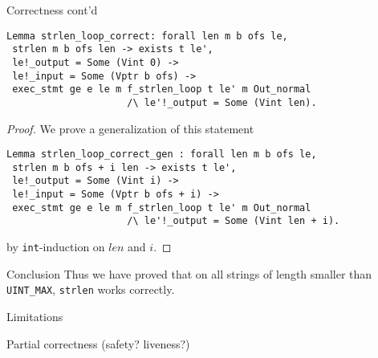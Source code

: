 \documentclass{beamer}
\begin{document}
  
\begin{frame}[fragile]{Correctness cont'd}

  
  
  \begin{lstlisting}[language=Coq]
 Lemma strlen_loop_correct: forall len m b ofs le,
 strlen m b ofs len -> exists t le',
 le!_output = Some (Vint 0) ->
 le!_input = Some (Vptr b ofs) ->
 exec_stmt ge e le m f_strlen_loop t le' m Out_normal
                     /\ le'!_output = Some (Vint len).
\end{lstlisting}

\begin{proof}
  We prove a generalization of this statement
  
 \begin{lstlisting}[language=Coq]
 Lemma strlen_loop_correct_gen : forall len m b ofs le,
 strlen m b ofs + i len -> exists t le',
 le!_output = Some (Vint i) ->
 le!_input = Some (Vptr b ofs + i) ->
 exec_stmt ge e le m f_strlen_loop t le' m Out_normal
                     /\ le'!_output = Some (Vint len + i).
\end{lstlisting}

by \texttt{int}-induction on $len$ and $i$. 

  \end{proof}

 



\end{frame}

\begin{frame}{Conclusion}
  Thus we have proved that on all strings of length smaller than
  \texttt{UINT\_MAX}, \texttt{strlen} works correctly.
  
  \end{frame}

  \begin{frame}
  
  Limitations

  Partial correctness (safety? liveness?)
  
  \end{frame}
\end{document}
